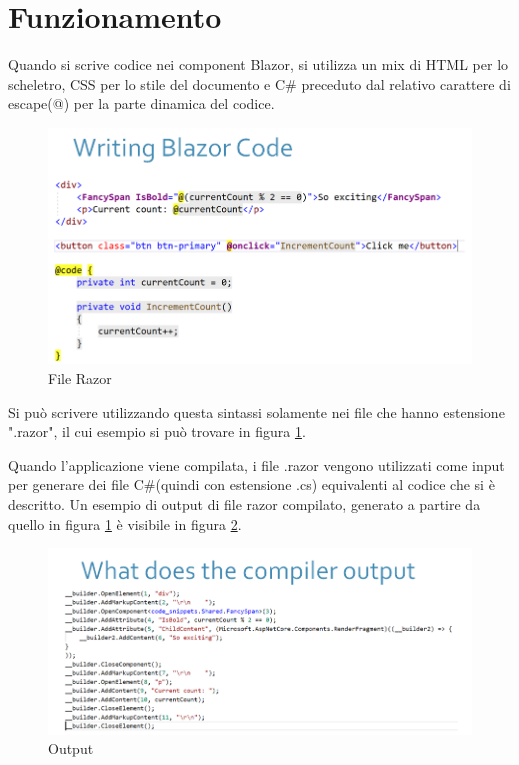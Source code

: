\section{Funzionamento}\label{sez:funzionamento}
Quando si scrive codice nei component Blazor, si utilizza un mix di HTML per lo scheletro, CSS per lo stile del documento e C\# preceduto dal relativo carattere di escape(@) per la parte dinamica del codice.
\begin{figure}[H]
	\centerline{\includegraphics[scale=0.55]{figure/RazorFile.png}}
	\caption{File Razor}
	\label{fig:razorFile}
\end{figure}
Si pu\`o scrivere utilizzando questa sintassi solamente nei file che hanno estensione ".razor", il cui esempio si pu\`o trovare in figura \ref{fig:razorFile}.

Quando l'applicazione viene compilata, i file .razor vengono utilizzati come input per generare dei file C\#(quindi con estensione .cs) equivalenti al codice che si \`e descritto\cite{ryanNowakNDCSydney}.
Un esempio di output di file razor compilato, generato a partire da quello in figura \ref{fig:razorFile} \`e visibile in figura \ref{fig:compiledRazorFile}.
\begin{figure}[H]
	\centerline{\includegraphics[scale=0.55]{figure/RazorFileCompiled.PNG}}
	\caption{Output}
	\label{fig:compiledRazorFile}
\end{figure}


